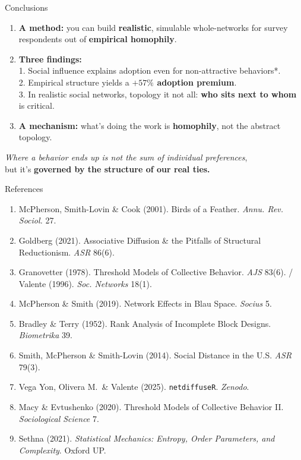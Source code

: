 \documentclass[aspectratio=169,11pt]{beamer}
\newcommand{\emphr}[1]{{\color{ndreddark}\textbf{#1}}}
\begin{document}
\begin{frame}{Conclusions}
\begin{enumerate}
  \item \textbf{A method:} you can build \emphr{realistic}, simulable whole-networks for survey respondents out of \emphr{empirical homophily}.
  \vspace{0.1cm}
  \item \textbf{Three findings:} \\
  \hspace{0.5cm} 1. Social influence explains adoption even for non-attractive behaviors*. \\
  \hspace{0.5cm} 2. Empirical structure yields a
        \emphr{$+57\%$ adoption premium}. \\
  \hspace{0.5cm} 3. In realistic social networks, topology it not all: \emphr{who sits next to whom} is critical.
  \vspace{0.1cm}
  \item \textbf{A mechanism:} what's doing the work is \emphr{homophily}, not the abstract topology.
\end{enumerate}
\vspace{0.2cm}
\begin{center}\small
\emph{Where a behavior ends up is not the sum of individual preferences}, \\
but it's \emphr{governed by the structure of our real ties.}
\end{center}
\end{frame}

\begin{frame}{References}
\footnotesize
\begin{enumerate}\itemsep1.2pt
  \item McPherson, Smith-Lovin \& Cook (2001). Birds of a Feather. \emph{Annu. Rev. Sociol.} 27.
  \item Goldberg (2021). Associative Diffusion \& the Pitfalls of Structural Reductionism. \emph{ASR} 86(6).
  \item Granovetter (1978). Threshold Models of Collective Behavior. \emph{AJS} 83(6). / Valente (1996). \emph{Soc. Networks} 18(1).
  \item McPherson \& Smith (2019). Network Effects in Blau Space. \emph{Socius} 5.
  \item Bradley \& Terry (1952). Rank Analysis of Incomplete Block Designs. \emph{Biometrika} 39.
  \item Smith, McPherson \& Smith-Lovin (2014). Social Distance in the U.S. \emph{ASR} 79(3).
  \item Vega Yon, Olivera M.\ \& Valente (2025). \texttt{netdiffuseR}. \emph{Zenodo}.
  \item Macy \& Evtushenko (2020). Threshold Models of Collective Behavior II. \emph{Sociological Science} 7.
  \item Sethna (2021). \emph{Statistical Mechanics: Entropy, Order Parameters, and Complexity}. Oxford UP.
\end{enumerate}
\end{frame}
\end{document}
